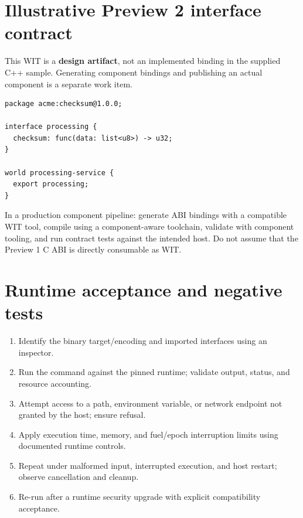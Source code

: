 \documentclass[11pt,letterpaper]{article}
\begin{document}
\section{Illustrative Preview 2 interface contract}
This WIT is a \textbf{design artifact}, not an implemented binding in the supplied C++ sample. Generating component bindings and publishing an actual component is a separate work item.
\begin{lstlisting}[language={},caption={Conceptual WIT world for a transformation service}]
package acme:checksum@1.0.0;

interface processing {
  checksum: func(data: list<u8>) -> u32;
}

world processing-service {
  export processing;
}
\end{lstlisting}
In a production component pipeline: generate ABI bindings with a compatible WIT tool, compile using a component-aware toolchain, validate with component tooling, and run contract tests against the intended host. Do not assume that the Preview 1 C ABI is directly consumable as WIT.

\section{Runtime acceptance and negative tests}
\begin{enumerate}
\item Identify the binary target/encoding and imported interfaces using an inspector.
\item Run the command against the pinned runtime; validate output, status, and resource accounting.
\item Attempt access to a path, environment variable, or network endpoint not granted by the host; ensure refusal.
\item Apply execution time, memory, and fuel/epoch interruption limits using documented runtime controls.
\item Repeat under malformed input, interrupted execution, and host restart; observe cancellation and cleanup.
\item Re-run after a runtime security upgrade with explicit compatibility acceptance.
\end{enumerate}
\end{document}
